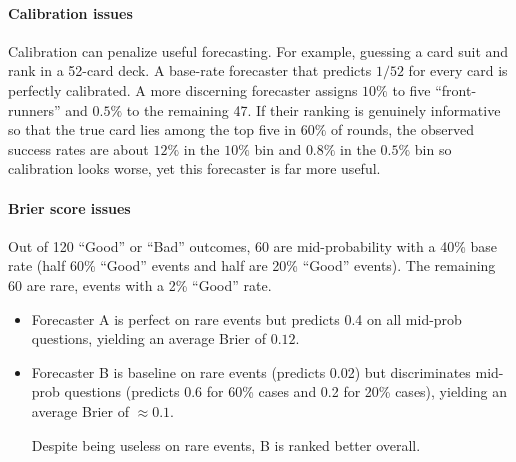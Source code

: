 \documentclass[12pt,a4paper]{article}
\begin{document}
\paragraph{Calibration issues}
Calibration can penalize useful forecasting. For example, guessing a card suit and rank in a 52-card deck. A base-rate forecaster that predicts $1/52$ for every card is perfectly calibrated. A more discerning forecaster assigns $10\%$ to five ``front-runners'' and $0.5\%$ to the remaining 47. If their ranking is genuinely informative so that the true card lies among the top five in $60\%$ of rounds, the observed success rates are about $12\%$ in the $10\%$ bin and $0.8\%$ in the $0.5\%$ bin so calibration looks worse, yet this forecaster is far more useful.

\paragraph{Brier score issues}
Out of 120 ``Good'' or ``Bad'' outcomes, 60 are mid-probability with a 40\% base rate (half 60\% ``Good'' events and half are 20\% ``Good'' events). The remaining 60 are rare, events with a 2\% ``Good'' rate.  
\begin{itemize}
\item Forecaster A is perfect on rare events but predicts 0.4 on all mid-prob questions, yielding an average Brier of $0.12$. 
\item Forecaster B is baseline on rare events (predicts 0.02) but discriminates mid-prob questions (predicts 0.6 for 60\% cases and 0.2 for 20\% cases), yielding an average Brier of $\approx 0.1$. 

Despite being useless on rare events, B is ranked better overall.

\end{itemize}
\end{document}
